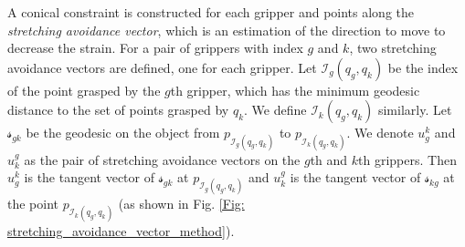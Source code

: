 A conical constraint is constructed for each gripper and points along the \textit{stretching avoidance vector}, which is an estimation of the direction to move to decrease the strain. For a pair of grippers with index $g$ and $k$, two stretching avoidance vectors are defined, one for each gripper. 
Let $\mathcal{I}_g(q_g,q_k)$ be the index of the point grasped by the $g$th gripper, which has the minimum geodesic distance to the set of points grasped by $q_k$. We define $\mathcal{I}_k(q_g,q_k)$ similarly. 
Let $\mathcal{s}_{gk}$ be the geodesic on the object from $p_{\mathcal{I}_g(q_g,q_k)}$ to $p_{\mathcal{I}_k(q_g,q_k)}$.
We denote $u_g^k$ and $u_k^g$ as the pair of stretching avoidance vectors on the $g$th and $k$th grippers. 
Then $u^k_g$ is the tangent vector of $\mathcal{s}_{gk}$ at $p_{\mathcal{I}_g(q_g,q_k)}$ and $u^g_k$ is the tangent vector of $\mathcal{s}_{kg}$ at the point $p_{\mathcal{I}_k(q_g,q_k)}$ (as shown in Fig. \ref{Fig: stretching_avoidance_vector_method}). 

